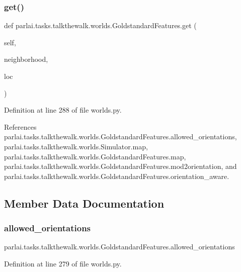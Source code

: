 \subsubsection{\texorpdfstring{get()}{get()}}
{\footnotesize\ttfamily def parlai.\+tasks.\+talkthewalk.\+worlds.\+Goldstandard\+Features.\+get (\begin{DoxyParamCaption}\item[{}]{self,  }\item[{}]{neighborhood,  }\item[{}]{loc }\end{DoxyParamCaption})}



Definition at line 288 of file worlds.\+py.



References parlai.\+tasks.\+talkthewalk.\+worlds.\+Goldstandard\+Features.\+allowed\+\_\+orientations, parlai.\+tasks.\+talkthewalk.\+worlds.\+Simulator.\+map, parlai.\+tasks.\+talkthewalk.\+worlds.\+Goldstandard\+Features.\+map, parlai.\+tasks.\+talkthewalk.\+worlds.\+Goldstandard\+Features.\+mod2orientation, and parlai.\+tasks.\+talkthewalk.\+worlds.\+Goldstandard\+Features.\+orientation\+\_\+aware.



\subsection{Member Data Documentation}
\mbox{\label{classparlai_1_1tasks_1_1talkthewalk_1_1worlds_1_1GoldstandardFeatures_ab3bb9dde5bd73f87d51b926d2cbac56d}} 
\subsubsection{\texorpdfstring{allowed\+\_\+orientations}{allowed\_orientations}}
{\footnotesize\ttfamily parlai.\+tasks.\+talkthewalk.\+worlds.\+Goldstandard\+Features.\+allowed\+\_\+orientations}



Definition at line 279 of file worlds.\+py.



